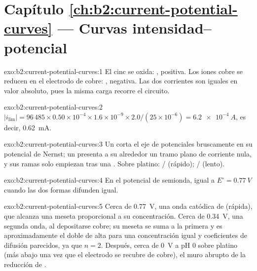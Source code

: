\section*{Capítulo \ref{ch:b2:current-potential-curves} --- Curvas intensidad--potencial}

\begin{solution}{exo:b2:current-potential-curves:1}
El cinc se oxida: , positiva. Los iones cobre se reducen en el
electrodo de cobre: , negativa. Las dos corrientes son iguales en
valor absoluto, pues la misma carga recorre el circuito.
\end{solution}

\begin{solution}{exo:b2:current-potential-curves:2}
$|i_{\lim}| = 96\,485 \times 0.50 \times 10^{-4} \times 1.6 \times 10^{-9} \times
2.0/(25 \times 10^{-6}) = \qty{6.2e-4}{A}$, es decir, \qty{0.62}{mA}.
\end{solution}

\begin{solution}{exo:b2:current-potential-curves:3}
Un  corta el eje de potenciales bruscamente en su potencial de Nernst; un  presenta a su alrededor un tramo plano de corriente nula, y sus ramas solo empiezan
tras una . Sobre platino: / (rápido);
/ (lento).
\end{solution}

\begin{solution}{exo:b2:current-potential-curves:4}
En el potencial de semionda, igual a $E^\circ = \qty{0.77}{V}$ cuando las dos formas
difunden igual.
\end{solution}

\begin{solution}{exo:b2:current-potential-curves:5}
Cerca de \qty{0.77}{V}, una onda catódica de  (rápida), que alcanza una meseta
proporcional a su concentración. Cerca de \qty{0.34}{V}, una segunda onda, al depositarse
cobre; su meseta se suma a la primera y es aproximadamente el doble de alta para una
concentración igual y coeficientes de difusión parecidos, ya que $n = 2$. Después, cerca de
\qty{0}{V} a pH 0 sobre platino (más abajo una vez que el electrodo se recubre de cobre),
el muro abrupto de la reducción de .
\end{solution}

